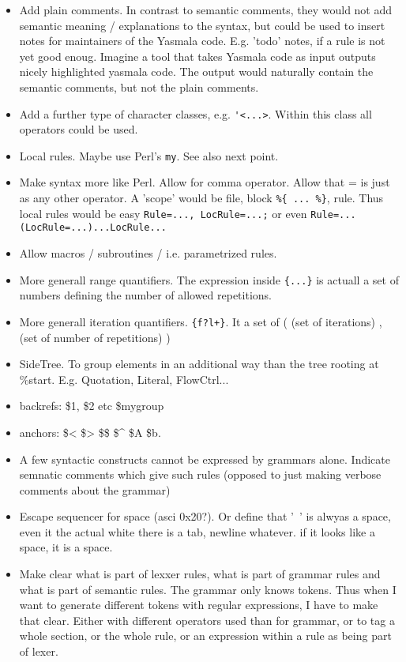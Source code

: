 \documentclass[a4paper]{report}
\begin{document}
\begin{itemize}
\item Add plain comments. In contrast to semantic comments, they would not add
      semantic meaning / explanations to the syntax, but could be used to insert
      notes for maintainers of the Yasmala code. E.g. 'todo' notes, if a rule is
      not yet good enoug. Imagine a tool that takes Yasmala code as input
      outputs nicely highlighted yasmala code. The output would naturally
      contain the semantic comments, but not the plain comments.
\item Add a further type of character classes, e.g. \verb|'<...>|. Within this
      class all operators could be used. 
\item Local rules. Maybe use Perl's \verb|my|. See also next point.
\item Make syntax more like Perl. Allow for comma operator. Allow that = is just
      as any other operator. A 'scope' would be file, block \verb|%{ ... %}|, rule.
      Thus local rules would be easy \verb|Rule=..., LocRule=...;| or even
      \verb|Rule=...(LocRule=...)...LocRule...|
\item Allow macros / subroutines / i.e. parametrized rules.
\item More generall range quantifiers. The expression inside \verb|{...}| is
      actuall a set of numbers defining the number of allowed repetitions. 
\item More generall iteration quantifiers. \verb"{f?l+}". It a set of ( (set of
      iterations) , (set of number of repetitions) )
\item SideTree. To group elements in an additional way than the tree rooting
      at \%start. E.g. Quotation, Literal, FlowCtrl...
\item backrefs: \$1, \$2 etc \$mygroup
\item anchors: \$< \$> \$\$ \$^ \$A \$b.  
\item A few syntactic constructs cannot be expressed by grammars alone. 
      Indicate semnatic comments which give such rules (opposed to just
      making verbose comments about the grammar)      
\item Escape sequencer for space (asci 0x20?). Or define that '\ ' is alwyas
  a space, even it the actual white there is a tab, newline whatever. if it  looks like a space, it is a space.
\item Make clear what is part of lexxer rules, what is part of grammar rules
      and what is part of semantic rules. The grammar only knows tokens. Thus
      when I want to generate different tokens with regular expressions, I
      have to make that clear. Either with different operators used than for
      grammar, or to tag a whole section, or the whole rule, or an expression
      within a rule as being part of lexer.
\end{itemize}
\end{document}

